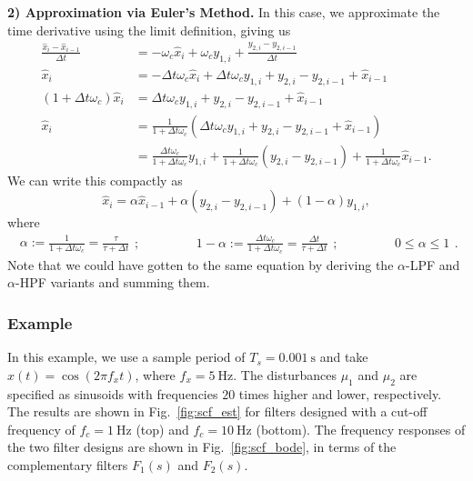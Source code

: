 \documentclass[a4paper]{article}
\begin{document}
\noindent\textbf{2) Approximation via Euler's Method.} In this case, we approximate the time derivative using the limit definition, giving us
\begin{align*}
\frac{\hat{x}_i - \hat{x}_{i-1}}{\Delta t} &= -\omega_c\hat{x}_{i} + \omega_cy_{1,i} + \frac{y_{2,i} - y_{2,i-1}}{\Delta t} \\
\hat{x}_i &=  -\Delta t\omega_c\hat{x}_{i} + \Delta t \omega_c y_{1,i} + y_{2,i} - y_{2,i-1} + \hat{x}_{i-1} \\
(1+\Delta t\omega_c)\hat{x}_i &=  \Delta t \omega_c y_{1,i} + y_{2,i} - y_{2,i-1} + \hat{x}_{i-1} \\
\hat{x}_i &=  \frac{1}{1+\Delta t\omega_c} \left(\Delta t \omega_c y_{1,i} + y_{2,i} - y_{2,i-1} + \hat{x}_{i-1}\right) \\
          &=  \frac{\Delta t \omega_c}{1+\Delta t\omega_c} y_{1,i} + \frac{1}{1+\Delta t\omega_c}\left(y_{2,i} - y_{2,i-1}\right) + \frac{1}{1+\Delta t\omega_c} \hat{x}_{i-1}.
\end{align*}
We can write this compactly as
\begin{equation}
\hat{x}_i = \alpha\hat{x}_{i-1} + \alpha\left(y_{2,i} - y_{2,i-1}\right) + (1-\alpha)y_{1,i},
\end{equation}
where
\begin{equation*}
\begin{split}
\alpha := \frac{1}{1+\Delta t\omega_c} = \frac{\tau}{\tau+\Delta t}
\end{split};
\qquad\qquad
\begin{split}
1-\alpha := \frac{\Delta t\omega_c}{1+\Delta t\omega_c} = \frac{\Delta t}{\tau+\Delta t}
\end{split};
\qquad\qquad
\begin{split}
0\le\alpha\le1
\end{split}.
\end{equation*}
Note that we could have gotten to the same equation by deriving the $\alpha$-LPF and $\alpha$-HPF variants and summing them.

\subsubsection*{Example}
In this example, we use a sample period of $T_s=\SI{0.001}{\second}$ and take $x(t)=\cos(2\pi f_x t)$, where $f_x=\SI{5}{\Hz}$.
The disturbances $\mu_1$ and $\mu_2$ are specified as sinusoids with frequencies $20$ times higher and lower, respectively.
The results are shown in Fig.~\ref{fig:scf_est} for filters designed with a cut-off frequency of $f_c=\SI{1}{\Hz}$ (top) and $f_c=\SI{10}{\Hz}$ (bottom).
The frequency responses of the two filter designs are shown in Fig.~\ref{fig:scf_bode}, in terms of the complementary filters $F_1(s)$ and $F_2(s)$.
\end{document}
